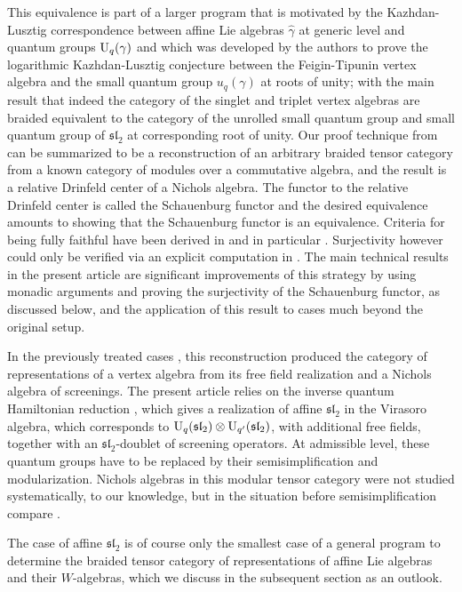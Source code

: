 \documentclass[a4paper, reqno]{amsart}
\theoremstyle{introTheorems}
\renewcommand\sl{\mathfrak{sl}}
\newcommand\g\gamma
\renewcommand{\1}{\mathbbold{1}}
\begin{document}
    This equivalence is part of a larger program  that is motivated by  the Kazhdan-Lusztig correspondence \cites{KL93a, KL93b, KL93c} between affine Lie algebras $\hat{\g}$ at generic level and quantum groups $\Uq(\g)$ \cites{CLR21, CLR23, CN25, Len25} and which was developed by the authors to prove the logarithmic Kazhdan-Lusztig conjecture \cites{FGST05, FT10} between the Feigin-Tipunin vertex algebra and the small quantum group $u_q(\g)$ at roots of unity; with the main result that indeed the category of the singlet and triplet vertex algebras are braided equivalent to the category of the unrolled small quantum group and small quantum group of $\sl_2$ at corresponding root of unity.  Our proof technique from \cite{CLR23} can be summarized to be a reconstruction of an arbitrary braided tensor category from a known category of modules over a  commutative algebra, and the result is a relative Drinfeld center of a Nichols algebra. The functor to the relative Drinfeld center is called the Schauenburg functor and the desired equivalence amounts to showing that the Schauenburg functor is an equivalence. Criteria for being fully faithful have been derived in \cite{CLR23}  and in particular \cite[Theorem 3.20]{CMSY24}. Surjectivity however could only be verified via an explicit computation in \cite{CLR23}.
    The main technical results in the present article are significant improvements of this strategy by using monadic arguments and proving the surjectivity of the Schauenburg functor, as discussed below, and the application of this result to cases much beyond the original setup. 

    In the previously treated cases \cite{CLR23}, this reconstruction produced the category of representations of a vertex algebra from its free field realization and a Nichols algebra of screenings. The present article relies on the inverse quantum Hamiltonian reduction \cite{A}, which gives a realization of affine $\sl_2$ in the Virasoro algebra,   which corresponds to $\Uq(\sl_2) \otimes \mathrm{U}_{q'}(\sl_2)$, with additional free fields, together with an $\sl_2$-doublet  of screening operators. At admissible level, these quantum groups have to be replaced by their semisimplification and modularization. Nichols algebras in this modular tensor category were not studied systematically, to our knowledge, but in the situation before semisimplification compare \cite{CL17, AA20}. 
    
    The case of affine $\sl_2$ is of course only the smallest case of a general program to determine the braided tensor category of representations of affine Lie algebras and their $W$-algebras, which we discuss in the subsequent section as an outlook.
\end{document}
